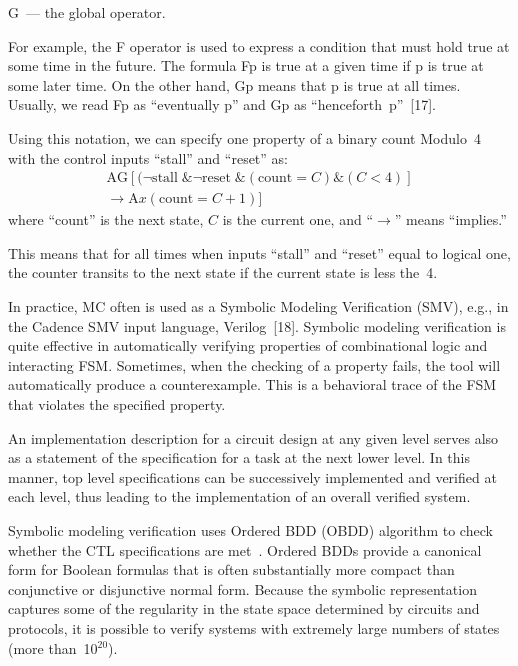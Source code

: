 \begin{multicols}{2}
 G~--- the global operator.

   For example, the F operator is used to express a condition that must hold true at some time in the future.
The formula Fp is true at a given time if p is true at some later time. On the other hand, Gp means that
p is true at all times. Usually, we read Fp as ``eventually p'' and Gp
as ``henceforth~p''~[17].



   Using this notation, we can specify one property of a binary count Modulo~4
with the control inputs ``stall''  and ``reset'' as:
\begin{multline*}
\mathrm{AG}[(\lnot \mathrm{stall}\; \&\lnot \mathrm{reset}\;\&
(\mathrm{count}=C)\&(C<4)] \\
{}\rightarrow \mathrm{A}x(\mathrm{count}=C+1)]
\end{multline*}
where ``count'' is the next state, $C$ is the current one,
and ``$\rightarrow$'' means ``implies.''

  This means that for all times when inputs ``stall'' and ``reset'' equal to logical one, the counter transits to
the next state if the current state is less the~4.

   In practice, MC often is used as a Symbolic Modeling Verification
(SMV), e.g., in the Cadence SMV
input language, Verilog~[18]. Symbolic modeling verification
is quite effective in automatically verifying properties of
combinational logic and interacting FSM. Sometimes, when the checking of a property fails, the
tool will automatically produce a counterexample. This is a behavioral trace of the FSM that
violates the specified property.

   An implementation description for a circuit design at any given level serves also as a statement of the
specification for a task at the next lower level. In this manner,
top level specifications can be successively
implemented and verified at each level, thus leading to the implementation of an overall verified system.





Symbolic modeling verification uses Ordered BDD (OBDD) algorithm to check whether the CTL specifications
are met~\cite{17bar}. Ordered BDDs provide a canonical form for Boolean formulas that is often substantially more
compact than conjunctive or disjunctive normal form. Because the symbolic representation captures some of the
regularity in the state space determined by circuits and protocols, it is possible to verify systems with extremely
large numbers of states (more than~10$^{20}$).
{%

}
\end{multicols}
